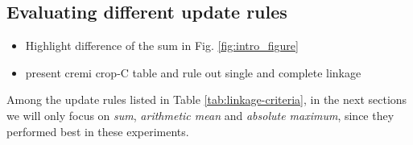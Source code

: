 



\subsection{Evaluating different update rules} \label{sec:exp_first_comparison}
\begin{itemize}
  \item Highlight difference of the sum in Fig. \ref{fig:intro_figure}
  \item present cremi crop-C table and rule out single and complete linkage
\end{itemize}

Among the update rules listed in Table \ref{tab:linkage-criteria}, in the next sections we will only focus on \emph{sum}, \emph{arithmetic mean} and \emph{absolute maximum}, since they performed best in these experiments.


